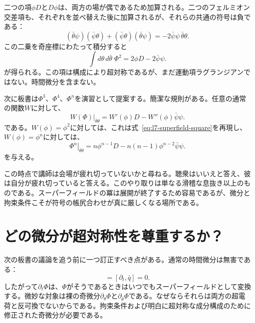 二つの項\(\phi D\)と\(D\phi\)は、両方の場が偶であるため加算される。二つのフェルミオン交差項も、それぞれを並べ替えた後に加算されるが、それらの共通の符号は負である：
\begin{equation}
(\bar\theta\psi)(\bar\psi\theta)
+(\bar\psi\theta)(\bar\theta\psi)
=-2\bar\psi\psi\,\bar\theta\theta.
\end{equation}
この二乗を奇座標にわたって積分すると
\begin{equation}
\int d\theta\,d\bar\theta\;\Phi^2
=2\phi D-2\bar\psi\psi.
\end{equation}
が得られる。この項は構成により超対称であるが、まだ運動項ラグランジアンではない。時間微分を含まない。

次に板書は\(\Phi^3\)、\(\Phi^4\)、\(\Phi^n\)を演習として提案する。簡潔な規則がある。任意の通常の関数\(W\)に対して、
\begin{equation}
\left.W(\Phi)\right|_{\bar\theta\theta}
=W'(\phi)D-W''(\phi)\bar\psi\psi.
\label{eq:l7-function-top-component}
\end{equation}
である。\(W(\phi)=\phi^2\)に対しては、これは式~\eqref{eq:l7-superfield-square}を再現し、\(W(\phi)=\phi^n\)に対しては、
\begin{equation}
\left.\Phi^n\right|_{\bar\theta\theta}
=n\phi^{n-1}D-n(n-1)\phi^{n-2}\bar\psi\psi.
\end{equation}
を与える。

この時点で講師は会場が疲れ切っていないかと尋ねる。聴衆はいいえと答え、彼は自分が疲れ切っていると答える。このやり取りは単なる滑稽な息抜き以上のものである。スーパーフィールドの冪は展開が終了するため容易であるが、微分と拘束条件こそが符号の帳尻合わせが真に厳しくなる場所である。

\section{どの微分が超対称性を尊重するか？}

次の板書の議論を追う前に一つ訂正すべき点がある。通常の時間微分は無害である：
\begin{equation}
[\partial_t,q]=[\partial_t,\bar q]=0.
\end{equation}
したがって\(\partial_t\Phi\)は、\(\Phi\)がそうであるときはいつでもスーパーフィールドとして変換する。微妙な対象は裸の奇微分\(\partial_\theta\Phi\)と\(\partial_{\bar\theta}\Phi\)である。なぜならそれらは両方の超電荷と反可換でないからである。拘束条件および明白に超対称な成分構成のために修正された奇微分が必要である。

